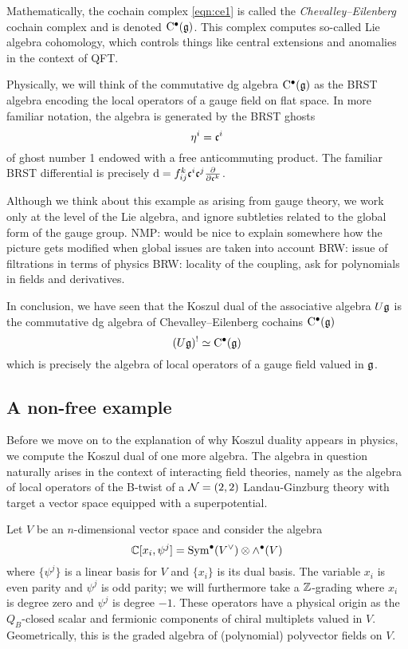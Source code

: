 \documentclass[11pt]{amsart}
\def\brian#1{{\textcolor{blue!65!red}{BRW: {#1}}}}
\def\natalie#1{{\textcolor{green!65!black}{NMP: {#1}}}}
\begin{document}
Mathematically, the cochain complex \eqref{eqn:ce1} is called the {\em Chevalley--Eilenberg} cochain complex and is denoted ${\rm C}^\bullet(\mathfrak g)$. 
This complex computes so-called Lie algebra cohomology, which controls things like central extensions and anomalies in the context of QFT. 

Physically, we will think of the commutative dg algebra ${\rm C}^\bullet(\mathfrak g)$ as the BRST algebra encoding the local operators of a gauge field on flat space. 
In more familiar notation, the algebra is generated by the BRST ghosts 
\[
\eta^i = \mathfrak c^{i}
\]
of ghost number 1 endowed with a free anticommuting product.
The familiar BRST differential is precisely ${\rm d} = f_{ij}^k \mathfrak c^i \mathfrak c^j \frac{\partial}{\partial \mathfrak c^k}$.

Although we think about this example as arising from gauge theory, we work only at the level of the Lie algebra, and ignore subtleties related to the global form of the gauge group. \natalie{would be nice to explain somewhere how the picture gets modified when global issues are taken into account} 
\brian{issue of filtrations in terms of physics}
\brian{locality of the coupling, ask for polynomials in fields and derivatives.}

In conclusion, we have seen that the Koszul dual of the associative algebra $U \mathfrak g$ is the commutative dg algebra of Chevalley--Eilenberg cochains ${\rm C}^\bullet(\mathfrak g)$
\[
(U \mathfrak g)^! \simeq {\rm C}^\bullet (\mathfrak g) 
\]
which is precisely the algebra of local operators of a gauge field valued in $\mathfrak g$. 

\subsection{A non-free example} 
\label{sec:LG1}

Before we move on to the explanation of why Koszul duality appears in physics, we compute the Koszul dual of one more algebra. The algebra in question naturally arises in the context of interacting field theories, namely as the algebra of local operators of the B-twist of a $\mathcal N = (2,2)$ Landau-Ginzburg theory with target a vector space equipped with a superpotential.

Let $V$ be an $n$-dimensional vector space and consider the algebra 
\[
\mathbb C[x_i, \psi^j] = \operatorname{Sym}^\bullet (V^\vee) \otimes \wedge^\bullet(V) 
\]
where $\{\psi^j\}$ is a linear basis for $V$ and $\{x_i\}$ is its dual basis.
The variable $x_i$ is even parity and $\psi^j$ is odd parity; we will furthermore take a $\mathbb Z$-grading where $x_i$ is degree zero and $\psi^j$ is degree $-1$. These operators have a physical origin as the $Q_B$-closed scalar and fermionic components of chiral multiplets valued in $V$.
Geometrically, this is the graded algebra of (polynomial) polyvector fields on $V$.
\end{document}

